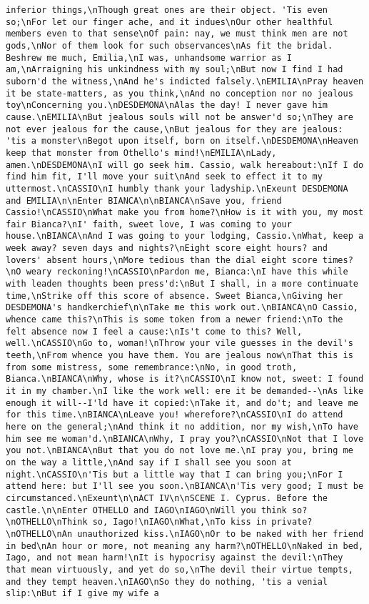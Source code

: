 \begin{verbatim}
inferior things,\nThough great ones are their object. 'Tis even so;\nFor let our finger ache, and it indues\nOur other healthful members even to that sense\nOf pain: nay, we must think men are not gods,\nNor of them look for such observances\nAs fit the bridal. Beshrew me much, Emilia,\nI was, unhandsome warrior as I am,\nArraigning his unkindness with my soul;\nBut now I find I had suborn'd the witness,\nAnd he's indicted falsely.\nEMILIA\nPray heaven it be state-matters, as you think,\nAnd no conception nor no jealous toy\nConcerning you.\nDESDEMONA\nAlas the day! I never gave him cause.\nEMILIA\nBut jealous souls will not be answer'd so;\nThey are not ever jealous for the cause,\nBut jealous for they are jealous: 'tis a monster\nBegot upon itself, born on itself.\nDESDEMONA\nHeaven keep that monster from Othello's mind!\nEMILIA\nLady, amen.\nDESDEMONA\nI will go seek him. Cassio, walk hereabout:\nIf I do find him fit, I'll move your suit\nAnd seek to effect it to my uttermost.\nCASSIO\nI humbly thank your ladyship.\nExeunt DESDEMONA and EMILIA\n\nEnter BIANCA\n\nBIANCA\nSave you, friend Cassio!\nCASSIO\nWhat make you from home?\nHow is it with you, my most fair Bianca?\nI' faith, sweet love, I was coming to your house.\nBIANCA\nAnd I was going to your lodging, Cassio.\nWhat, keep a week away? seven days and nights?\nEight score eight hours? and lovers' absent hours,\nMore tedious than the dial eight score times?\nO weary reckoning!\nCASSIO\nPardon me, Bianca:\nI have this while with leaden thoughts been press'd:\nBut I shall, in a more continuate time,\nStrike off this score of absence. Sweet Bianca,\nGiving her DESDEMONA's handkerchief\n\nTake me this work out.\nBIANCA\nO Cassio, whence came this?\nThis is some token from a newer friend:\nTo the felt absence now I feel a cause:\nIs't come to this? Well, well.\nCASSIO\nGo to, woman!\nThrow your vile guesses in the devil's teeth,\nFrom whence you have them. You are jealous now\nThat this is from some mistress, some remembrance:\nNo, in good troth, Bianca.\nBIANCA\nWhy, whose is it?\nCASSIO\nI know not, sweet: I found it in my chamber.\nI like the work well: ere it be demanded--\nAs like enough it will--I'ld have it copied:\nTake it, and do't; and leave me for this time.\nBIANCA\nLeave you! wherefore?\nCASSIO\nI do attend here on the general;\nAnd think it no addition, nor my wish,\nTo have him see me woman'd.\nBIANCA\nWhy, I pray you?\nCASSIO\nNot that I love you not.\nBIANCA\nBut that you do not love me.\nI pray you, bring me on the way a little,\nAnd say if I shall see you soon at night.\nCASSIO\n'Tis but a little way that I can bring you;\nFor I attend here: but I'll see you soon.\nBIANCA\n'Tis very good; I must be circumstanced.\nExeunt\n\nACT IV\n\nSCENE I. Cyprus. Before the castle.\n\nEnter OTHELLO and IAGO\nIAGO\nWill you think so?\nOTHELLO\nThink so, Iago!\nIAGO\nWhat,\nTo kiss in private?\nOTHELLO\nAn unauthorized kiss.\nIAGO\nOr to be naked with her friend in bed\nAn hour or more, not meaning any harm?\nOTHELLO\nNaked in bed, Iago, and not mean harm!\nIt is hypocrisy against the devil:\nThey that mean virtuously, and yet do so,\nThe devil their virtue tempts, and they tempt heaven.\nIAGO\nSo they do nothing, 'tis a venial slip:\nBut if I give my wife a 
\end{verbatim}
